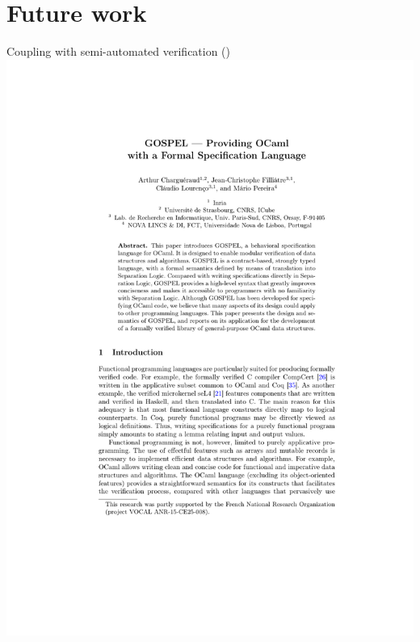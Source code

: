 \section{Future work}

\begin{frame}{Coupling with semi-automated verification (\Gospel)}
\centering
\includegraphics[scale=0.6]{images/chargueraud_filliatre_lourenco_pereira.pdf}
\end{frame}